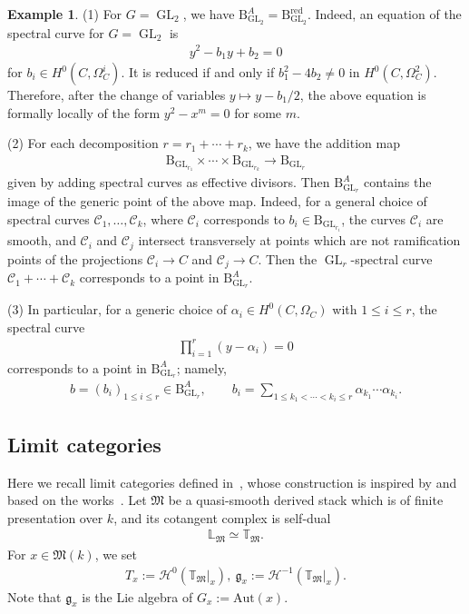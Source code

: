 \documentclass[11pt,oneside,a4paper,mathscr]{amsart}
\theoremstyle{definition}
\newtheorem{example}[thm]{Example}
\renewcommand{\leq}{\leqslant}
\newcommand{\cH}{\mathcal{H}}
\newcommand{\cC}{\mathcal{C}}
\newcommand{\rB}{\mathrm{B}}
\newcommand{\GL}{\operatorname{GL}}
\begin{document}
\begin{example}\label{exam:Atype}
(1) For $G=\GL_2$, we have $\rB_{\GL_2}^A=\rB_{\GL_2}^{\mathrm{red}}$. 
Indeed, an equation of the spectral curve for $G=\GL_2$ is 
\begin{align*}
    y^2 -b_1 y +b_2=0
\end{align*}
for $b_i \in H^0(C, \Omega_C^i)$. It is reduced if and only if 
$b_1^2 -4b_2 \neq 0$ in $H^0(C, \Omega_C^2)$.
Therefore, after the change of variables $y\mapsto y-b_1/2$, the 
above equation is formally locally of the form $y^2-x^m=0$ for some $m$. 

(2)  
For each decomposition $r=r_1+\cdots+r_k$, we have the addition map
\begin{align*}
    \rB_{\GL_{r_1}} \times \cdots \times \rB_{\GL_{r_k}}
    \to \rB_{\GL_r}
\end{align*}
given by adding spectral curves as effective divisors. 
Then $\rB_{\GL_r}^{A}$ contains the image of the generic point of the above map. 
Indeed, for a general choice of spectral curves 
$\cC_1, \ldots, \cC_k$, where $\cC_i$ corresponds to 
$b_i \in \rB_{\GL_{r_i}}$, the curves $\cC_i$ are smooth, and 
$\cC_i$ and $\cC_j$ intersect transversely at points which are not ramification points 
of the projections $\cC_i \to C$ and $\cC_j \to C$. 
Then the $\GL_r$-spectral curve $\cC_1+\cdots+\cC_k$ corresponds to a point in 
$\rB_{\GL_r}^{A}$. 

(3) In particular, for a generic choice of 
$\alpha_i \in H^0(C, \Omega_C)$ with $1 \leq i\leq r$, the spectral curve 
\begin{align*}
    \prod_{i=1}^r (y-\alpha_i)=0
\end{align*}
corresponds to a point in $\rB_{\GL_r}^{A}$; namely,
\begin{align*}
    b=(b_i)_{1\leq i\leq r} \in \rB_{\GL_r}^{A}, \qquad
    b_i=\sum_{1\leq k_1<\cdots<k_i\leq r}
    \alpha_{k_1} \cdots \alpha_{k_i}.
\end{align*}
\end{example}



\subsection{Limit categories}
Here we recall limit categories defined in~\cite{PTlim}, whose construction is inspired by and based on 
the works~\cite{SvdB, hls}. 
Let $\mathfrak{M}$ be a quasi-smooth derived stack which is of finite presentation over $k$, and 
its cotangent complex is self-dual
\begin{align}\label{L:cotangent}
    \mathbb{L}_{\mathfrak{M}} \simeq \mathbb{T}_{\mathfrak{M}}.
\end{align}
For $x \in \mathfrak{M}(k)$, 
we set 
\begin{align*}
T_x:=
\cH^{0}(\mathbb{T}_{\mathfrak{M}}|_{x}), \ 
\mathfrak{g}_x:=
\cH^{-1}(\mathbb{T}_{\mathfrak{M}}|_{x}).
\end{align*}
Note that $\mathfrak{g}_x$ is the Lie algebra of 
$G_x:=\mathrm{Aut}(x)$. 
\end{document}
